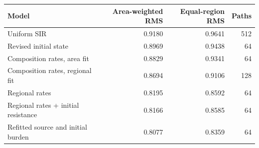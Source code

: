 \begin{tabular}{lrrr}\toprule Model & Area-weighted RMS & Equal-region RMS & Paths\\\midrule
Uniform SIR & 0.9180 & 0.9641 & 512\\
Revised initial state & 0.8969 & 0.9438 & 64\\
Composition rates, area fit & 0.8829 & 0.9341 & 64\\
Composition rates, regional fit & 0.8694 & 0.9106 & 128\\
Regional rates & 0.8195 & 0.8592 & 64\\
Regional rates + initial resistance & 0.8166 & 0.8585 & 64\\
Refitted source and initial burden & 0.8077 & 0.8359 & 64\\
\bottomrule\end{tabular}